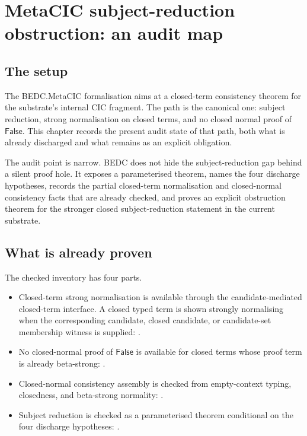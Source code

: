 \chapter{MetaCIC subject-reduction obstruction: an audit map}
\label{ch:metacic-subject-reduction-obstruction}

\section{The setup}
\label{sec:metacic-subject-reduction-obstruction-setup}

The BEDC.MetaCIC formalisation aims at a closed-term consistency theorem for the substrate's internal CIC fragment. The path is the canonical one: subject reduction, strong normalisation on closed terms, and no closed normal proof of $\mathsf{False}$. This chapter records the present audit state of that path, both what is already discharged and what remains as an explicit obligation.

The audit point is narrow. BEDC does not hide the subject-reduction gap behind a silent proof hole. It exposes a parameterised theorem, names the four discharge hypotheses, records the partial closed-term normalisation and closed-normal consistency facts that are already checked, and proves an explicit obstruction theorem for the stronger closed subject-reduction statement in the current substrate.

\section{What is already proven}
\label{sec:metacic-subject-reduction-obstruction-proven}

The checked inventory has four parts.

\begin{itemize}
\item Closed-term strong normalisation is available through the candidate-mediated closed-term interface. A closed typed term is shown strongly normalising when the corresponding candidate, closed candidate, or candidate-set membership witness is supplied:   .
\item No closed-normal proof of $\mathsf{False}$ is available for closed terms whose proof term is already beta-strong: .
\item Closed-normal consistency assembly is checked from empty-context typing, closedness, and beta-strong normality: .
\item Subject reduction is checked as a parameterised theorem conditional on the four discharge hypotheses: .
\end{itemize}

